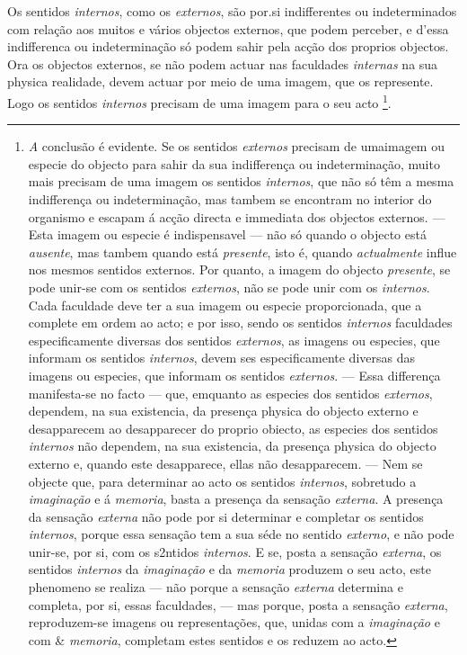 Os sentidos \emph{internos}, como os \emph{externos}, são por.si indifferentes ou indeterminados com relação aos muitos e vários objectos externos, que podem perceber, e d'essa indifferenca ou indeterminação só podem sahir pela acção dos proprios objectos. Ora os objectos externos, se não podem actuar nas faculdades \emph{internas} na sua physica realidade, devem actuar por meio de uma imagem, que os represente. Logo os sentidos \emph{internos} precisam de uma imagem para o seu acto \footnote{\emph{A} conclusão é evidente. Se os sentidos \emph{externos} precisam de umaimagem ou especie do objecto para sahir da sua indifferença ou indeterminação, muito mais precisam de uma imagem os sentidos \emph{internos}, que não só têm a mesma indifferença ou indeterminação, mas tambem se encontram no interior do organismo e escapam á acção directa e immediata dos objectos externos. --- Esta imagem ou especie é indispensavel --- não só quando o objecto está \emph{ausente}, mas tambem quando está \emph{presente}, isto é, quando \emph{actualmente} influe nos mesmos sentidos externos. Por quanto, a imagem do objecto \emph{presente}, se pode unir-se com os sentidos \emph{externos}, não se pode unir com os \emph{internos}. Cada faculdade deve ter a sua imagem ou especie proporcionada, que a complete em ordem ao acto; e por isso, sendo os sentidos \emph{internos} faculdades especificamente diversas dos sentidos \emph{externos}, as imagens ou especies, que informam os sentidos \emph{internos}, devem ses especificamente diversas das imagens ou especies, que informam os sentidos \emph{externos}. --- Essa differença manifesta-se no facto --- que, emquanto as especies dos sentidos \emph{externos}, dependem, na sua existencia, da presença physica do objecto externo e desapparecem ao desapparecer do proprio obiecto, as especies dos sentidos \emph{internos} não dependem, na sua existencia, da presença physica do objecto externo e, quando este desapparece, ellas não desapparecem. --- Nem se objecte que, para determinar ao acto os sentidos \emph{internos}, sobretudo a \emph{imaginação} e á \emph{memoria}, basta a presença da sensação \emph{externa}. A presença da sensação \emph{externa} não pode por si determinar e completar os sentidos \emph{internos}, porque essa sensação tem a sua séde no sentido \emph{externo}, e não pode unir-se, por si, com os s2ntidos \emph{internos}. E se, posta a sensação \emph{externa}, os sentidos \emph{internos} da \emph{imaginação} e da \emph{memoria} produzem o seu acto, este phenomeno se realiza --- não porque a sensação \emph{externa} determina e completa, por si, essas faculdades, --- mas porque, posta a sensação \emph{externa}, reproduzem-se imagens ou representações, que, unidas com a \emph{imaginação} e com \& \emph{memoria}, completam estes sentidos e os reduzem ao acto.}.

